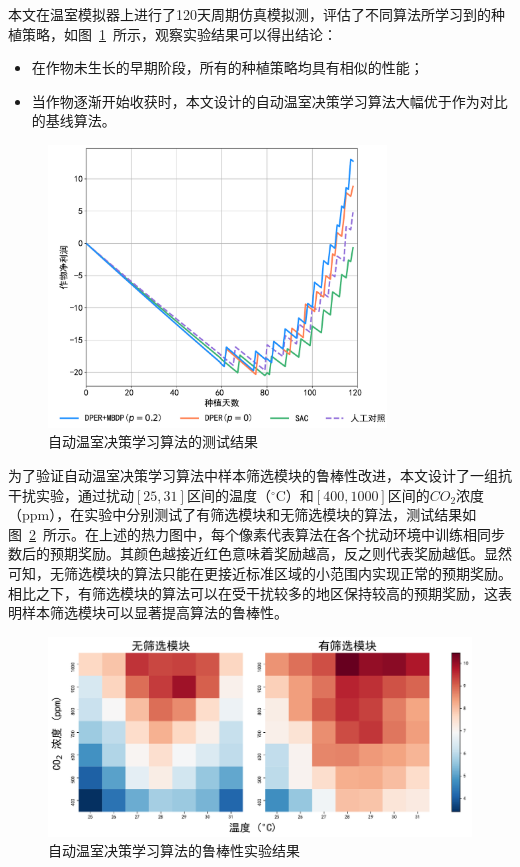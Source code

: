 本文在温室模拟器上进行了120天周期仿真模拟测，评估了不同算法所学习到的种植策略，如图~\ref{fig:acml-test}~所示，观察实验结果可以得出结论：

\begin{itemize}
    \item 在作物未生长的早期阶段，所有的种植策略均具有相似的性能；
    \item 当作物逐渐开始收获时，本文设计的自动温室决策学习算法大幅优于作为对比的基线算法。
\end{itemize}

\begin{figure}[ht]
\centering
\includegraphics[width=0.8\textwidth]{figures/acml-test.pdf}
\caption{自动温室决策学习算法的测试结果}
\label{fig:acml-test}
\end{figure}

为了验证自动温室决策学习算法中样本筛选模块的鲁棒性改进，本文设计了一组抗干扰实验，通过扰动$[25, 31]$区间的温度（$^\circ$C）和$[400, 1000]$区间的$CO_2$浓度（ppm），在实验中分别测试了有筛选模块和无筛选模块的算法，测试结果如图~\ref{fig:robustness}~所示。在上述的热力图中，每个像素代表算法在各个扰动环境中训练相同步数后的预期奖励。其颜色越接近红色意味着奖励越高，反之则代表奖励越低。显然可知，无筛选模块的算法只能在更接近标准区域的小范围内实现正常的预期奖励。相比之下，有筛选模块的算法可以在受干扰较多的地区保持较高的预期奖励，这表明样本筛选模块可以显著提高算法的鲁棒性。

\begin{figure}[ht]
\centering
\includegraphics[width=\textwidth]{figures/robustness-heatmap-for-iros.pdf}
\caption{自动温室决策学习算法的鲁棒性实验结果}
\label{fig:robustness}
\end{figure}

